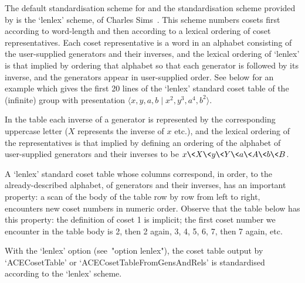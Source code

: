
The default standardisation scheme for {\GAP} and  the
standardisation scheme provided by {\ACE} is the `lenlex'  scheme,  of
Charles Sims~\cite{Sim94}. This scheme numbers cosets first  according
to word-length and then according  to  a  lexical  ordering  of  coset
representatives. Each coset representative is a word  in  an  alphabet
consisting of the user-supplied generators and their inverses, and the
lexical ordering of `lenlex' is that implied by ordering that alphabet
so that each generator is followed by its inverse, and the  generators
appear in user-supplied order. See below for an  example  which  gives
the first 20 lines  of  the  `lenlex'  standard  coset  table  of  the
(infinite) group with presentation $\langle x, y, a, b \mid x^2,  y^3,
a^4, b^2\rangle$.

In the table each  inverse  of  a  generator  is  represented  by  the
corresponding uppercase letter ($X$  represents  the  inverse  of  $x$
etc.), and the lexical ordering of the representatives is that implied
by defining an ordering of the alphabet  of  user-supplied  generators
and  their  inverses  to  be  $x\<X\<y\<Y\<a\<A\<b\<B$.  

A `lenlex' standard coset table whose columns correspond, in order, to
the already-described alphabet, of generators and their inverses,  has
an important property: a scan of the body of the table row by row from
left to right, encounters new coset numbers in numeric order.  Observe
that the table below has this property: the definition of coset  1  is
implicit; the first coset number we encounter in the table body is  2,
then 2 again, 3, 4, 5, 6, 7, then 7 again, etc.

With the `lenlex' option (see~"option lenlex"), the coset table output
by `ACECosetTable' or `ACECosetTableFromGensAndRels'  is  standardised
according to the `lenlex' scheme.

